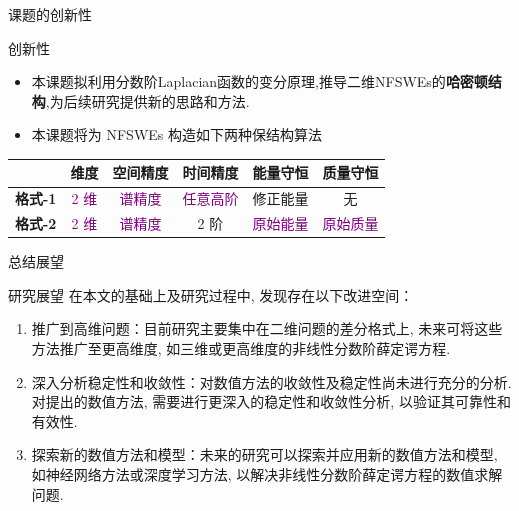 \documentclass[aspectratio=169]{beamer}
\begin{document}
\begin{frame}{课题的创新性}
	\begin{block}{创新性}
		\begin{itemize}
			\item {\footnotesize 本课题拟利用分数阶Laplacian函数的变分原理,推导二维NFSWEs的\textbf{\textcolor[rgb]{0.227,0.373,0.306}{哈密顿结构}},为后续研究提供新的思路和方法.}
			\item {\footnotesize 本课题将为 NFSWEs 构造如下两种保结构算法}
		\end{itemize}
	\begin{table}[htbp]
		\centering
		  \begin{tabular}{cccccc}
		  \toprule
		  \textcolor[rgb]{0.227,0.373,0.306}{} & \textcolor[rgb]{0.227,0.373,0.306}{\textbf{维度}} & \textcolor[rgb]{0.227,0.373,0.306}{\textbf{空间精度}} & \textcolor[rgb]{0.227,0.373,0.306}{\textbf{时间精度}} & \textcolor[rgb]{0.227,0.373,0.306}{\textbf{能量守恒}} & \textcolor[rgb]{0.227,0.373,0.306}{\textbf{质量守恒}} \\
		  \midrule
		  \textcolor[rgb]{0.227,0.373,0.306}{\textbf{格式-1}} & \textcolor{purple}{2 维}   & \textcolor{purple}{谱精度}   & \textcolor{purple}{任意高阶}  & 修正能量  & 无 \\
		  \midrule
		  \textcolor[rgb]{0.227,0.373,0.306}{\textbf{格式-2}} & \textcolor{purple}{2 维}   & \textcolor{purple}{谱精度}   & 2 阶   & \textcolor{purple}{原始能量}  & \textcolor{purple}{原始质量} \\
		  \bottomrule
		  \end{tabular}%
		\label{tab:3}%
	  \end{table}%
	\end{block}
	\end{frame}
\begin{frame}{总结展望}
	\begin{block}{研究展望}
		在本文的基础上及研究过程中, 发现存在以下改进空间：
		\begin{enumerate}
			\item \textcolor[rgb]{0.227,0.373,0.306}{推广到高维问题：}目前研究主要集中在二维问题的差分格式上, 未来可将这些方法推广至更高维度, 如三维或更高维度的非线性分数阶薛定谔方程.
			\item \textcolor[rgb]{0.227,0.373,0.306}{深入分析稳定性和收敛性：}对数值方法的收敛性及稳定性尚未进行充分的分析. 对提出的数值方法, 需要进行更深入的稳定性和收敛性分析, 以验证其可靠性和有效性.
			\item \textcolor[rgb]{0.227,0.373,0.306}{探索新的数值方法和模型：}未来的研究可以探索并应用新的数值方法和模型, 如神经网络方法或深度学习方法, 以解决非线性分数阶薛定谔方程的数值求解问题.
		\end{enumerate}
	\end{block}
\end{frame}
	
\end{document}
